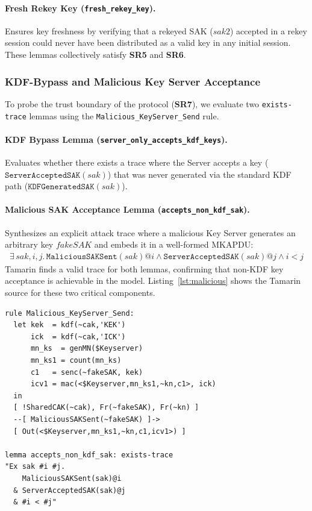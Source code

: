 \paragraph{Fresh Rekey Key (\texttt{fresh\_rekey\_key}).} Ensures key freshness by verifying that a rekeyed SAK ($\mathit{sak2}$) accepted in a rekey session could never have been distributed as a valid key in any initial session. These lemmas collectively satisfy \textbf{SR5} and \textbf{SR6}.

\subsubsection{KDF-Bypass and Malicious Key Server Acceptance}
To probe the trust boundary of the protocol (\textbf{SR7}), we evaluate two \texttt{exists-trace} lemmas using the \texttt{Malicious\_KeyServer\_Send} rule.

\begin{sloppypar}
\paragraph{KDF Bypass Lemma (\texttt{server\_only\_accepts\_kdf\_keys}).} Evaluates whether there exists a trace where the Server accepts a key ($\mathtt{ServerAcceptedSAK}(\mathit{sak})$) that was never generated via the standard KDF path ($\mathtt{KDFGeneratedSAK}(\mathit{sak})$).
\end{sloppypar}

\paragraph{Malicious SAK Acceptance Lemma (\texttt{accepts\_non\_kdf\_sak}).} Synthesizes an explicit attack trace where a malicious Key Server generates an arbitrary key $\mathit{fakeSAK}$ and embeds it in a well-formed MKAPDU:
\begin{align*}
\exists \, \mathit{sak}, i, j. \, \mathtt{MaliciousSAKSent}(\mathit{sak})@i \land \mathtt{ServerAcceptedSAK}(\mathit{sak})@j \land i < j
\end{align*}
Tamarin finds a valid trace for both lemmas, confirming that non-KDF key acceptance is achievable in the model. Listing~\ref{lst:malicious} shows the Tamarin source for these two critical components.

\begin{lstlisting}[caption={Malicious Key Server rule and KDF-bypass existence lemma in Tamarin syntax.},label={lst:malicious}]
rule Malicious_KeyServer_Send:
  let kek  = kdf(~cak,'KEK')
      ick  = kdf(~cak,'ICK')
      mn_ks  = genMN($Keyserver)
      mn_ks1 = count(mn_ks)
      c1   = senc(~fakeSAK, kek)
      icv1 = mac(<$Keyserver,mn_ks1,~kn,c1>, ick)
  in
  [ !SharedCAK(~cak), Fr(~fakeSAK), Fr(~kn) ]
  --[ MaliciousSAKSent(~fakeSAK) ]->
  [ Out(<$Keyserver,mn_ks1,~kn,c1,icv1>) ]

lemma accepts_non_kdf_sak: exists-trace
"Ex sak #i #j.
    MaliciousSAKSent(sak)@i
  & ServerAcceptedSAK(sak)@j
  & #i < #j"
\end{lstlisting}

